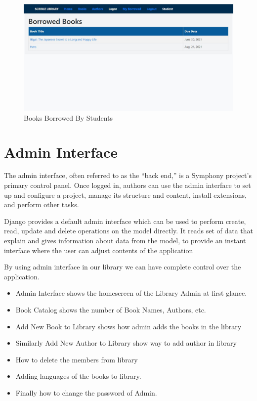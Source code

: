 \documentclass[12pt, a4paper]{report}
\begin{document}
\newpage
\begin{figure}[htb]
	\centering
	\includegraphics[scale=0.5]{./students} 
	\caption{Books Borrowed By Students}
	\label{fig:borroed} 
\end{figure}

\newpage
\section{Admin Interface}

The admin interface, often referred to as the “back end,” is a Symphony project's primary control panel. Once logged in, authors can use the admin interface to set up and configure a project, manage its structure and content, install extensions, and perform other tasks.

\par Django provides a default admin interface which can be used to perform create, read, update and delete operations on the model directly. It reads set of data that explain and gives information about data from the model, to provide an instant interface where the user can adjust contents of the application 

By using admin interface in our library we can have complete control over the application.
\begin{itemize}
	\item Admin Interface shows the homescreen of the Library Admin at first glance.
	\item Book Catalog shows the number of Book Names, Authors, etc.
	\item Add New Book to Library shows how admin adds the books in the library
	\item Similarly Add New Author to Library show way to add author in library
	\item How to delete the members from library
	\item Adding languages of the books to library.
	\item Finally how to change the password of Admin.
\end{itemize}
\end{document}
